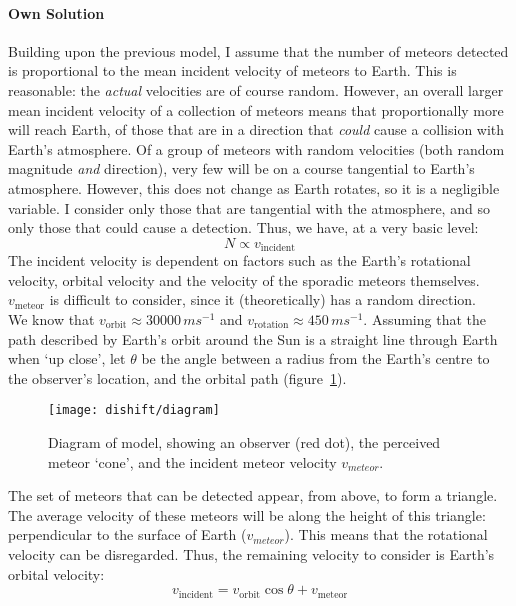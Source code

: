 \paragraph{Own Solution\\}
\label{sec:dishift:model}
Building upon the previous model, I assume that the number of meteors detected is proportional to the mean incident velocity of meteors to Earth. This is reasonable: the {\it actual} velocities are of course random. However, an overall larger mean incident velocity of a collection of meteors means that proportionally more will reach Earth, of those that are in a direction that {\it could} cause a collision with Earth's atmosphere. Of a group of meteors with random velocities (both random magnitude {\it and} direction), very few will be on a course tangential to Earth's atmosphere. However, this does not change as Earth rotates, so it is a negligible variable. I consider only those that are tangential with the atmosphere, and so only those that could cause a detection. Thus, we have, at a very basic level:
\begin{equation}
N \propto v_{\text{incident}} 
\end{equation}
The incident velocity is dependent on factors such as the Earth's rotational velocity, orbital velocity and the velocity of the sporadic meteors themselves. $v_{\text{meteor}}$ is difficult to consider, since it (theoretically) has a random direction. \\
We know that $v_{\text{orbit}} \approx 30000 \, ms^{-1}$ and  $v_{\text{rotation}} \approx 450 \, ms^{-1}$. Assuming that the path described by Earth's orbit around the Sun is a straight line through Earth when `up close', let $\theta$ be the angle between a radius from the Earth's centre to the observer's location, and the orbital path (figure~\ref{fig:dishift:ownmodel}). 
\begin{figure}
	\centering
	\texttt{[image: dishift/diagram]}
	\caption{Diagram of model, showing an observer (red dot), the perceived meteor `cone', and the incident meteor velocity $v_{meteor}$.
		\label{fig:dishift:ownmodel}}
\end{figure}
The set of meteors that can be detected appear, from above, to form a triangle. The average velocity of these meteors will be along the height of this triangle: perpendicular to the surface of Earth ($v_{meteor}$). This means that the rotational velocity can be disregarded. Thus, the remaining velocity to consider is Earth's orbital velocity:
\begin{equation}
v_{\text{incident}} = v_{\text{orbit}} \cos \theta + v_{\text{meteor}}
\end{equation}
